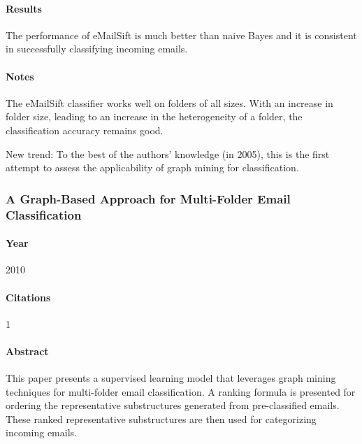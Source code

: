\documentclass[12pt]{article}
\newenvironment{my_itemize}
{\begin{itemize}
  \setlength{\itemsep}{0cm}
  \setlength{\parskip}{0cm}}
{\end{itemize}}
\begin{document}
\paragraph{Results} 
\begin{my_itemize}
 \item The performance of eMailSift is much better than naive Bayes and it is consistent in successfully classifying incoming emails.
\end{my_itemize}

\paragraph{Notes}
\begin{my_itemize}
 \item The eMailSift classifier works well on folders of all sizes. With an increase in folder size, leading to an increase in the heterogeneity of a folder, the classification accuracy remains good.
 \item New trend: To the best of the authors’ knowledge (in 2005), this is the first attempt to assess the applicability of graph mining for classification. 
\end{my_itemize}


\subsubsection{A Graph-Based Approach for Multi-Folder Email Classification \cite{sift02}}
\paragraph{Year} 2010

\paragraph{Citations} 1

\paragraph{Abstract}
\begin{my_itemize}
 \item This paper presents a supervised learning model that leverages graph mining techniques for multi-folder email classification. A ranking formula is presented for ordering the representative substructures generated from pre-classified emails. These ranked representative substructures are then used for categorizing incoming emails.
\end{my_itemize}
\end{document}

